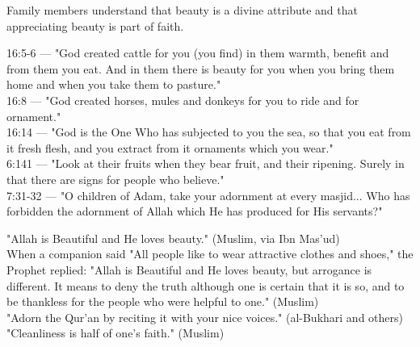 \documentclass[11pt,a4paper]{article}
\begin{document}
\begin{outcomebox} Family members understand that beauty is a divine attribute and that appreciating beauty is part of faith. \end{outcomebox}

\begin{quranbox} 16:5-6 --- "God created cattle for you (you find) in them warmth, benefit and from them you eat. And in them there is beauty for you when you bring them home and when you take them to pasture." \\ 16:8 --- "God created horses, mules and donkeys for you to ride and for ornament." \\ 16:14 --- "God is the One Who has subjected to you the sea, so that you eat from it fresh flesh, and you extract from it ornaments which you wear." \\ 6:141 --- "Look at their fruits when they bear fruit, and their ripening. Surely in that there are signs for people who believe." \\ 7:31-32 --- "O children of Adam, take your adornment at every masjid... Who has forbidden the adornment of Allah which He has produced for His servants?" \end{quranbox}

\begin{hadithbox} "Allah is Beautiful and He loves beauty." (Muslim, via Ibn Mas'ud) \\ When a companion said "All people like to wear attractive clothes and shoes," the Prophet replied: "Allah is Beautiful and He loves beauty, but arrogance is different. It means to deny the truth although one is certain that it is so, and to be thankless for the people who were helpful to one." (Muslim) \\ "Adorn the Qur'an by reciting it with your nice voices." (al-Bukhari and others) \\ "Cleanliness is half of one's faith." (Muslim) \end{hadithbox}
\end{document}
